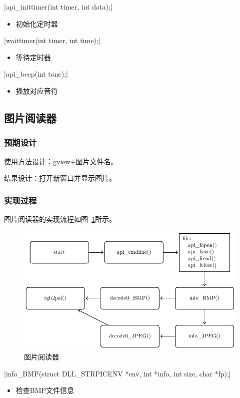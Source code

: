     \csingle|api_inittimer(int timer, int data);|
    \begin{itemize}
    \item 初始化定时器
    \end{itemize}

    \csingle|waittimer(int timer, int time);|
    \begin{itemize}
    \item 等待定时器
    \end{itemize}

    \csingle|api_beep(int tone);|
    \begin{itemize}
    \item 播放对应音符
    \end{itemize}

\subsection{图片阅读器}
    \subsubsection{预期设计}

    使用方法设计：gview+图片文件名。

    结果设计：打开新窗口并显示图片。
    \subsubsection{实现过程}
    图片阅读器的实现流程如图~\ref{fig:gview}所示。
    \begin{figure}[H]
        \centering
        \includegraphics[width=.7\textwidth]{../Fig/api/gview.pdf}
        \caption{图片阅读器}
        \label{fig:gview}
      \end{figure}

    \csingle|info_BMP(struct DLL_STRPICENV *env, int *info, int size, char *fp);|
    \begin{itemize}
    \item 检查BMP文件信息
    \end{itemize}

